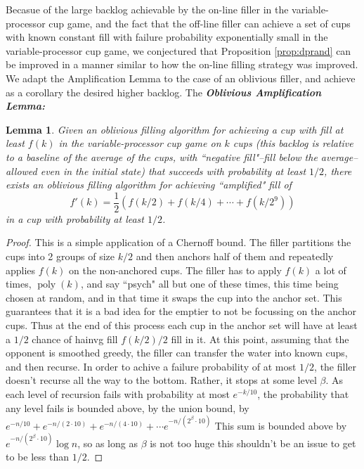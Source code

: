 \documentclass{article}[11pt]
\newcommand{\defn}[1]{{\textit{\textbf{\boldmath #1}}}}
\DeclareMathOperator{\poly}{\text{poly}}
\newtheorem{lemma}{Lemma}
\begin{document}
Becasue of the large backlog achievable by the on-line filler in the
variable-processor cup game, and the fact that the off-line filler can 
achieve a set of cups with known constant fill with failure probability
exponentially small in the variable-processor cup game, we conjectured that 
Proposition \ref{prop:dprand} can be improved in a manner similar to how the
on-line filling strategy was improved. We adapt the Amplification Lemma to the
case of an oblivious filler, and achieve as a corollary the desired higher backlog.
The \defn{Oblivious Amplification Lemma:}
\begin{lemma}
  \label{lem:obliviousamplification}
  Given an oblivious filling algorithm for achieving a cup with fill at least
  $f(k)$ in the variable-processor cup game on $k$ cups (this backlog is
  relative to a baseline of the average of the cups, with ``negative
  fill"--fill below the average--allowed even in the initial state) that
  succeeds with probability at least $1/2$, there exists an oblivious filling
  algorithm for achieving ``amplified" fill of $$f'(k) = \frac{1}{2}(f(k/2) +
  f(k/4) + \cdots + f(k/2^9))$$ in a cup with probability at least $1/2$.
\end{lemma}
\begin{proof}
  This is a simple application of a Chernoff bound.
  The filler partitions the cups into 2 groups of size $k/2$ and then anchors
  half of them and repeatedly applies $f(k)$ on the non-anchored cups.  The
  filler has to apply $f(k)$ a lot of times, $\poly(k)$, and say ``psych" all
  but one of these times, this time being chosen at random, and in that time it
  swaps the cup into the anchor set. This guarantees that it is a bad idea for
  the emptier to not be focussing on the anchor cups. Thus at the end of this process each
  cup in the anchor set will have at least a $1/2$ chance of hainvg fill $f(k/2)/2$ fill in it.
  At this point, assuming that the opponent is smoothed greedy, the filler can
  transfer the water into known cups, and then recurse. In order to achive a
  failure probability of at most $1/2$, the filler doesn't recurse all the way
  to the bottom. Rather, it stops at some level $\beta$. As each level of recursion fails with probability at
  most $e^{-k/10}$, the probability that any level fails is bounded above, by
  the union bound, by $e^{-n/10} + e^{-n/(2\cdot 10)} + e^{-n/(4\cdot 10)} + \cdots e^{-n/(2^\beta \cdot 10)}$
  This sum is bounded above by $e^{-n/(2^\beta \cdot 10)} \log n $, so as long
  as $\beta$ is not too huge this shouldn't be an issue to get to be less than $1/2$.
\end{proof}
\end{document}
